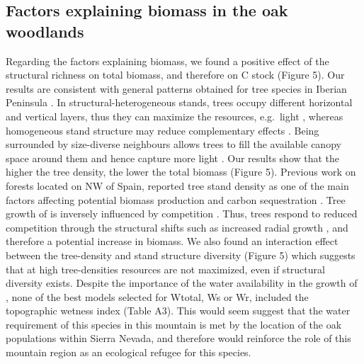\subsection{Factors explaining biomass in the oak woodlands}\label{sec:carbon:discussion-factors}
Regarding the factors explaining biomass, we found a positive effect of the structural richness on total biomass, and therefore on C stock (Figure 5). Our results are consistent with general patterns obtained for tree species in Iberian Peninsula \autocite{Vayredaetal2012SpatialPatterns}. In structural-heterogeneous stands, trees occupy different horizontal and vertical layers, thus they can maximize the resources, e.g.~light \autocite{Forrester2014StandlevelLight}, whereas homogeneous stand structure may reduce complementary effects \autocite{Goncalves2018EffectsForest,Vayredaetal2012SpatialPatterns}. Being surrounded by size-diverse neighbours allows trees to fill the available canopy space around them and hence capture more light \autocite{Forrester2014StandlevelLight,Vanhellemontetal2018SpeciesStructural}. Our results show that the higher the tree density, the lower the total biomass (Figure 5).
Previous work on forests located on NW of Spain, reported tree stand density as one of the main factors affecting potential biomass production and carbon sequestration \autocite{CastanoSantamariaetal2013PotentialGround}. Tree growth of \Qp is inversely influenced by competition \autocite{Canellasetal2004GrowthResponse,FernandezdeUnaetal2015StandCompetition,FernandezdeUnaetal2016DisentanglingEffect}. Thus, trees respond to reduced competition through the structural shifts such as increased radial growth \autocite{Canellasetal2004GrowthResponse,FernandezdeUnaetal2016DisentanglingEffect}, and therefore a potential increase in biomass. We also found an interaction effect between the tree-density and stand structure diversity (Figure 5) which suggests that at high tree-densities resources are not maximized, even if structural diversity exists.
Despite the importance of the water availability in the growth of \Qp \autocite{GeaIzquierdoCanellas2014LocalClimate,MorenoFernandezetal2020InfluenceClimate}, none of the best models selected for Wtotal, Ws or Wr, included the topographic wetness index (Table A3). This would seem suggest that the water requirement of this species in this mountain is met by the location of the oak populations within Sierra Nevada, and therefore would reinforce the role of this mountain region as an ecological refugee for this species.

\label{sec:carbon:discussion-differences}


